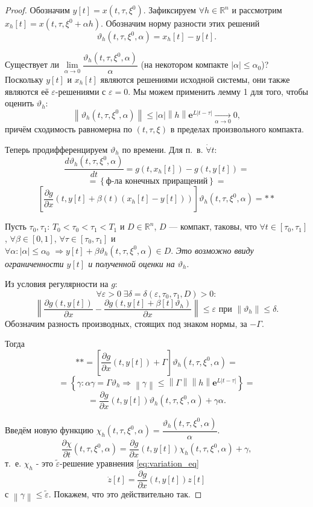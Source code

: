 \documentclass[12pt, a4paper]{article}
\theoremstyle{rusdef}
\newcommand\abs[1]{\left\lvert #1 \right\rvert} %
\newcommand{\R}{\ensuremath{\mathbb{R}}} %
\newcommand{\e}{\mathbf{e}}
\renewcommand{\d}{\partial} %
\newcommand{\norm}[1]{\left\lVert #1 \right\rVert} %
\DeclareMathOperator*{\thus}{\Rightarrow} %
\DeclareMathOperator*{\To}{\longrightarrow}
\begin{document}
\begin{proof}
Обозначим $y[t] = x(t, \tau, \xi^0)$. Зафиксируем $\forall h \in \R^n$  и рассмотрим $x_h[t] = x(t, \tau, \xi^0 + \alpha h)$. Обозначим норму разности этих решений
$$
\vartheta_h(t, \tau, \xi^0, \alpha) = x_h[t] - y[t].
$$

Существует ли $\lim\limits_{\alpha \to 0} \dfrac{\vartheta_h(t, \tau, \xi^0, \alpha)}{\alpha}$ (на некотором компакте $\abs{\alpha} \leqslant \alpha_0$)?
Поскольку $y[t]$ и $x_h[t]$ являются решениями исходной системы, они также являются её $\varepsilon$-решениями с $\varepsilon = 0$. Мы можем применить лемму 1 для того, чтобы оценить $\vartheta_h$:
$$
\norm{\vartheta_h(t, \tau, \xi^0, \alpha)} \leqslant \abs{\alpha} \norm{h} \e^{L\abs{t - \tau}} \To\limits_{\alpha \to 0} 0,
$$
причём сходимость равномерна по $(t, \tau, \xi)$ в пределах произвольного компакта.

Теперь продифференцируем $\vartheta_h$ по времени. Для п.~в. $\dot{\forall} t$:
$$
\dfrac{d \vartheta_h(t, \tau, \xi^0, \alpha)}{dt} = g(t, x_h[t]) - g(t, y[t]) = 
$$
$$
= \left\{ \text{ф-ла конечных приращений} \right\} =
$$
$$
\left[ \dfrac{\d g}{\d x}(t, y[t] + \beta(t)(x_h[t] - y[t])) \right] \vartheta_h(t, \tau, \xi^0, \alpha) = **
$$

Пусть $\tau_0, \tau_1$: $T_0 < \tau_0 < \tau_1 < T_1$ и $D \in \R^n$, $D$ --- компакт, таковы, что $\forall t \in [\tau_0, \tau_1]$, $\forall \beta \in [0,1]$, $\forall \tau \in [\tau_0, \tau_1]$ и \\ $\forall \alpha \colon \abs{\alpha} \leqslant \alpha_0$ $\thus y[t] + \beta \vartheta_h(t, \tau, \xi^0, \alpha) \in D$. \textit{Это возможно ввиду ограниченности $y[t]$ и полученной оценки на $\vartheta_h$}.

Из условия регулярности на $g$:
$$
\forall \varepsilon > 0 \; \exists \delta = \delta(\varepsilon, \tau_0, \tau_1, D) > 0 \colon
$$
$$
\norm{\dfrac{\d g(t, y[t])}{\d x} - \dfrac{\d g(t, y[t] + \beta[t] \vartheta_h)}{\d x}} \leqslant \varepsilon \text{ при } \norm{\vartheta_h} \leqslant \delta.
$$
Обозначим разность производных, стоящих под знаком нормы, за $-\Gamma$.

Тогда
$$
** = \left[ \dfrac{\d g}{\d x}(t, y[t]) + \Gamma \right] \vartheta_h(t, \tau, \xi^0, \alpha) =
$$
$$
 = \left\{ \gamma \colon \alpha \gamma = \Gamma \vartheta_h \thus \norm{\gamma} \leqslant \norm{\Gamma} \norm{h} \e^{L \abs{t - \tau}} \right\} =
$$
$$
= \dfrac{\d g}{\d x}(t, y[t])\vartheta_h(t, \tau, \xi^0, \alpha) + \gamma \alpha.
$$

Введём новую функцию $\chi_h(t, \tau, \xi^0, \alpha) = \dfrac{\vartheta_h(t, \tau, \xi^0, \alpha)}{\alpha}$. 
$$
\dfrac{\d \chi}{\d t}(t, \tau, \xi^0, \alpha) = \dfrac{\d g}{\d x}(t, y[t])\chi_h(t, \tau, \xi^0, \alpha) + \gamma,
$$
т.~е. $\chi_h$ - это $\tilde{\varepsilon}$-решение уравнения \eqref{eq:variation_eq}
$$
\dot{z}[t] = \dfrac{\d g}{\d x} (t, y[t])z[t]
$$
с $\norm{\gamma} \leqslant \tilde{\varepsilon}$. Покажем, что это действительно так.


\end{proof}
\end{document}
